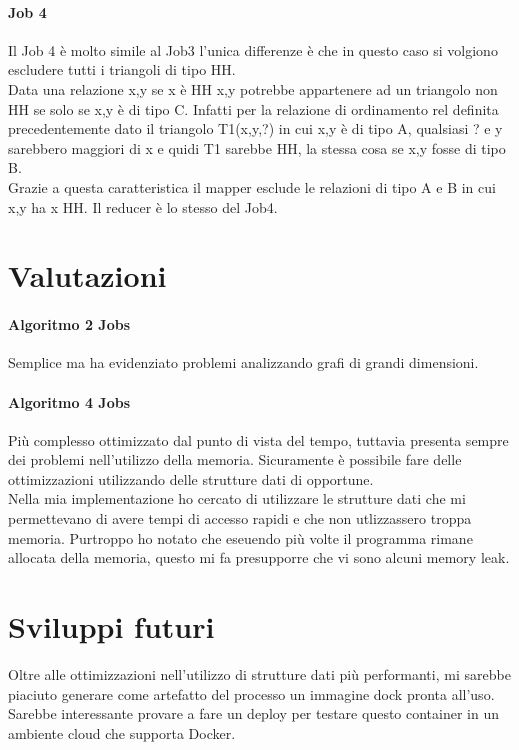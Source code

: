 \documentclass[paper=a4, fontsize=11pt]{scrartcl}	%
\numberwithin{equation}{section}															%
\numberwithin{figure}{section}																%
\numberwithin{table}{section}																%
\begin{document}
\paragraph{Job 4}
Il Job 4 è molto simile al Job3 l'unica differenze è che in questo caso si volgiono escludere tutti i triangoli di tipo HH.\\
Data una relazione x,y se x è HH x,y potrebbe appartenere ad un triangolo non HH se solo se x,y è di tipo C. Infatti per la relazione di ordinamento rel definita precedentemente dato il triangolo T1(x,y,?) in cui x,y è di tipo A, qualsiasi ? e y sarebbero maggiori di x e quidi T1 sarebbe HH, la stessa cosa se x,y fosse di tipo B.\\
Grazie a questa caratteristica il mapper esclude le relazioni di tipo A e B in cui x,y ha x HH.
Il reducer è lo stesso del Job4.


\section{Valutazioni}
\paragraph{Algoritmo 2 Jobs}
Semplice ma ha evidenziato problemi analizzando grafi di grandi dimensioni. 
\paragraph{Algoritmo 4 Jobs}
Più complesso ottimizzato dal punto di vista del tempo, tuttavia presenta sempre dei problemi nell'utilizzo della memoria. Sicuramente è possibile fare delle ottimizzazioni utilizzando delle strutture dati di opportune.\\ 
Nella mia implementazione ho cercato di utilizzare le strutture dati che mi permettevano di avere tempi di accesso rapidi e che non utlizzassero troppa memoria. Purtroppo ho notato che eseuendo più volte il programma rimane allocata della memoria, questo mi fa presupporre che vi sono alcuni memory leak.\\

\section{Sviluppi futuri}
Oltre alle ottimizzazioni nell'utilizzo di strutture dati più performanti, mi sarebbe piaciuto generare come artefatto del processo un immagine dock pronta all'uso. Sarebbe interessante provare a fare un deploy per testare questo container in un ambiente cloud che supporta Docker.
\end{document}
